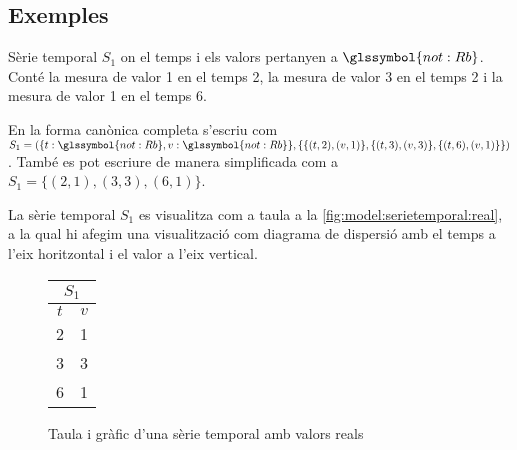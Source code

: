 \subsection{Exemples}


\begin{example}
  Sèrie temporal $S_1$ on el temps i els valors pertanyen a
  $\glssymbol{not:Rb}$. Conté la mesura de valor 1 en el temps 2, la mesura de
  valor 3 en el temps 2 i la mesura de valor 1 en el temps 6.

En la forma canònica completa s'escriu com $S_1 = ( \{t:
\glssymbol{not:Rb}, v: \glssymbol{not:Rb}\}, \{ \{(t,2),(v,1)\}, \{(t,3),(v,3)\},
\{(t,6),(v,1)\} \} )$. També es pot escriure de manera simplificada com a
$S_1 = \{ (2,1), (3,3), (6,1) \}$.


La sèrie temporal $S_1$ es visualitza com a taula a la
\autoref{fig:model:serietemporal:real}, a la qual hi afegim una
visualització com diagrama de dispersió amb el temps a l'eix
horitzontal i el valor a l'eix vertical.

\begin{figure}[tp]
  \centering
  \begin{tabular}[c]{|c|c|}
    \multicolumn{2}{c}{$S_1$} \\ \hline
    $t$  & $v$ \\ \hline
    2  & 1 \\
    3  & 3 \\
    6  & 1 \\ \hline
  \end{tabular} \qquad
  \caption{Taula i gràfic d'una sèrie temporal amb valors reals}
  \label{fig:model:serietemporal:real}
\end{figure}
 
\end{example}



